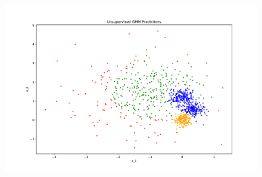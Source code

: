 \documentclass[11pt]{article}
\begin{document}
	\begin{figure}[H]
		\centering
		\includegraphics[width=\linewidth]{src/semi_supervised_em/pred_2.pdf}
	\end{figure}
	
	\newpage
\end{document}
